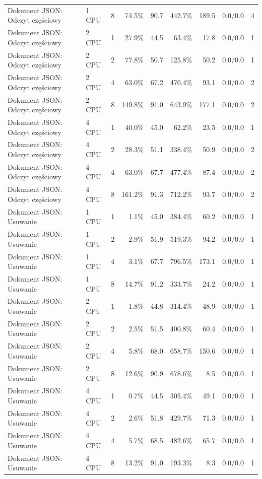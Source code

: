 \begin{table}[ht]
{\begin{tabular}{llcrrrrcc}
Dokument JSON: Odczyt częściowy & 1 CPU & 8 & 74.5\% & 90.7 & 442.7\% & 189.5 & 0.0/0.0 & 4 \\
Dokument JSON: Odczyt częściowy & 2 CPU & 1 & 27.9\% & 44.5 & 63.4\% & 17.8 & 0.0/0.0 & 1 \\
Dokument JSON: Odczyt częściowy & 2 CPU & 2 & 77.8\% & 50.7 & 125.8\% & 50.2 & 0.0/0.0 & 1 \\
Dokument JSON: Odczyt częściowy & 2 CPU & 4 & 63.0\% & 67.2 & 470.4\% & 93.1 & 0.0/0.0 & 2 \\
Dokument JSON: Odczyt częściowy & 2 CPU & 8 & 149.8\% & 91.0 & 643.9\% & 177.1 & 0.0/0.0 & 2 \\
Dokument JSON: Odczyt częściowy & 4 CPU & 1 & 40.0\% & 45.0 & 62.2\% & 23.5 & 0.0/0.0 & 1 \\
Dokument JSON: Odczyt częściowy & 4 CPU & 2 & 28.3\% & 51.1 & 338.4\% & 50.9 & 0.0/0.0 & 2 \\
Dokument JSON: Odczyt częściowy & 4 CPU & 4 & 63.0\% & 67.7 & 477.4\% & 87.4 & 0.0/0.0 & 2 \\
Dokument JSON: Odczyt częściowy & 4 CPU & 8 & 161.2\% & 91.3 & 712.2\% & 93.7 & 0.0/0.0 & 2 \\
Dokument JSON: Usuwanie & 1 CPU & 1 & 1.1\% & 45.0 & 384.4\% & 60.2 & 0.0/0.0 & 1 \\
Dokument JSON: Usuwanie & 1 CPU & 2 & 2.9\% & 51.9 & 519.3\% & 94.2 & 0.0/0.0 & 1 \\
Dokument JSON: Usuwanie & 1 CPU & 4 & 3.1\% & 67.7 & 796.5\% & 173.1 & 0.0/0.0 & 1 \\
Dokument JSON: Usuwanie & 1 CPU & 8 & 14.7\% & 91.2 & 333.7\% & 24.2 & 0.0/0.0 & 1 \\
Dokument JSON: Usuwanie & 2 CPU & 1 & 1.8\% & 44.8 & 314.4\% & 48.9 & 0.0/0.0 & 1 \\
Dokument JSON: Usuwanie & 2 CPU & 2 & 2.5\% & 51.5 & 400.8\% & 60.4 & 0.0/0.0 & 1 \\
Dokument JSON: Usuwanie & 2 CPU & 4 & 5.8\% & 68.0 & 658.7\% & 150.6 & 0.0/0.0 & 1 \\
Dokument JSON: Usuwanie & 2 CPU & 8 & 12.6\% & 90.9 & 678.6\% & 8.5 & 0.0/0.0 & 1 \\
Dokument JSON: Usuwanie & 4 CPU & 1 & 0.7\% & 44.5 & 305.4\% & 49.1 & 0.0/0.0 & 1 \\
Dokument JSON: Usuwanie & 4 CPU & 2 & 2.6\% & 51.8 & 429.7\% & 71.3 & 0.0/0.0 & 1 \\
Dokument JSON: Usuwanie & 4 CPU & 4 & 5.7\% & 68.5 & 482.6\% & 65.7 & 0.0/0.0 & 1 \\
Dokument JSON: Usuwanie & 4 CPU & 8 & 13.2\% & 91.0 & 193.3\% & 8.3 & 0.0/0.0 & 1 \\

\end{tabular}}
\end{table}
